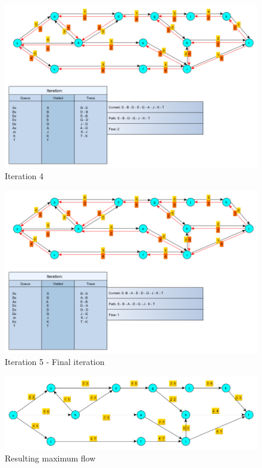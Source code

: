 \documentclass[10pt,a4paper]{article}
\begin{document}
\begin{enumerate}
	
	
	
\begin{figure}[H]
	\centering
	\includegraphics[width=0.9\linewidth]{img/fuckingFlowNetiter4}
	\caption{Iteration 4}
	\label{fig:fuckingflownetiter4}
\end{figure}
	
	
	
	
\begin{figure}[H]
	\centering
	\includegraphics[width=0.9\linewidth]{img/fuckingFlowNetiter5}
	\caption{Iteration 5 - Final iteration}
	\label{fig:fuckingflownetiter5}
\end{figure}


\begin{figure}[H]
	\centering
	\includegraphics[width=0.9\linewidth]{img/fuckingFlowNetMaxFlow}
	\caption{Resulting maximum flow}
	\label{fig:fuckingflownetmaxflow}
\end{figure}



\end{enumerate}
\end{document}
